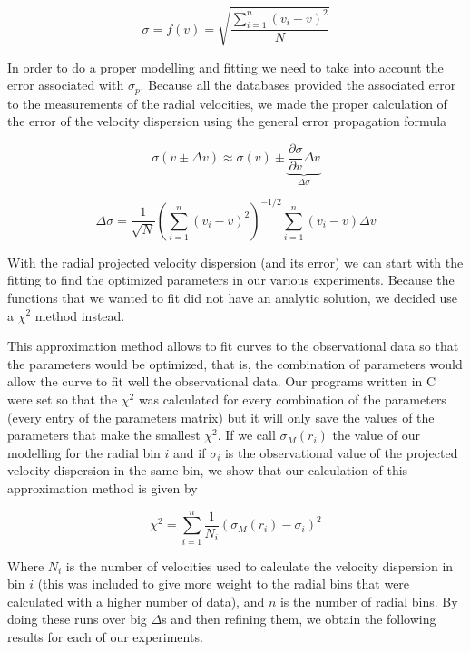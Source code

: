 \begin{equation}
\sigma = f(v) = \sqrt{\frac{\sum_{i=1}^{n}\left(v_{i}-v\right)^{2}}{N}}
\end{equation}

In order to do a proper modelling and fitting we need to take into account the error associated with $\sigma_{p}$. Because all the databases provided the associated error to the measurements of the radial velocities, we made the proper calculation of the error of the velocity dispersion using the general error propagation formula

\begin{equation}
\sigma(v\pm\Delta v)\approx \sigma(v)\pm \underbrace{\frac{\partial \sigma}{\partial v}\Delta v}_{\Delta \sigma}
\end{equation}

\begin{equation}
\Delta \sigma = \frac{1}{\sqrt{N}}\left(\sum_{i=1}^{n}\left(v_{i}-v\right)^{2}\right)^{-1/2}\sum_{i=1}^{n}\left(v_{i}-v\right)\Delta v
\end{equation}

With the radial projected velocity dispersion (and its error) we can start with the fitting to find the optimized parameters in our various experiments. Because the functions that we wanted to fit did not have an analytic solution, we decided use a $\chi^{2}$ method instead. 

This approximation method allows to fit curves to the observational data so that the parameters would be optimized, that is, the combination of parameters would allow the curve to fit well the observational data. Our programs written in C were set so that the $\chi^{2}$ was calculated for every combination of the parameters (every entry of the parameters matrix) but it will only save the values of the parameters that make the smallest $\chi^{2}$. If we call $\sigma_{M}(r_{i})$ the value of our modelling for the radial bin $i$ and if $\sigma_{i}$ is the observational value of the projected velocity dispersion in the same bin, we show that our calculation of this approximation method is given by 

\begin{equation}
\chi^{2}=\sum_{i=1}^{n}\frac{1}{N_{i}}{\left(\sigma_{M}\left(r_{i}\right)-\sigma_{i}\right)}^{2}
\end{equation}

Where $N_{i}$ is the number of velocities used to calculate the velocity dispersion in bin $i$ (this was included to give more weight to the radial bins that were calculated with a higher number of data), and $n$ is the number of radial bins. By doing these runs over big $\Delta$s and then refining them, we obtain the following results for each of our experiments.
  
